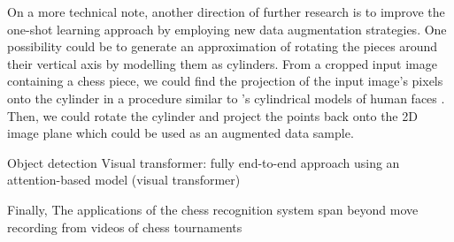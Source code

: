 \documentclass[../main.tex]{subfiles}
\begin{document}
On a more technical note, another direction of further research is to improve the one-shot learning approach by employing new data augmentation strategies.
One possibility could be to generate an approximation of rotating the pieces around their vertical axis by modelling them as cylinders.
From a cropped input image containing a chess piece, we could find the projection of the input image's pixels onto the cylinder in a procedure similar to \citeauthor{sung2008}'s cylindrical models of human faces \cite{sung2008}.
Then, we could rotate the cylinder and project the points back onto the 2D image plane which could be used as an augmented data sample.

Object detection
Visual transformer: fully end-to-end approach using an attention-based model (visual transformer)
\cite{wu2020}

Finally, 
The applications of the chess recognition system span beyond
move recording from videos of chess tournaments

\ifSubfilesClassLoaded{%
\printglossary[type=\acronymtype]%
\printbibliography%
}{}%
\end{document}
